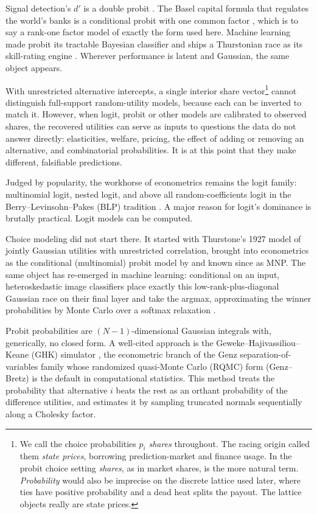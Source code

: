 \documentclass[12pt]{article}
\theoremstyle{remark}
\begin{document}
Signal detection's $d'$ is a
double probit \citep{green1966}. The Basel capital formula that
regulates the world's banks is a conditional probit with one common
factor \citep{vasicek2002,gordy2003}, which is to say a rank-one factor
model of exactly the form used here. Machine learning made probit its
tractable Bayesian classifier \citep{albertchib1993} and ships a
Thurstonian race as its skill-rating engine \citep{herbrich2006}.
Wherever performance is latent and Gaussian, the same object appears.

With unrestricted alternative intercepts, a single interior share
vector\footnote{We call the choice probabilities $p_i$ \emph{shares} throughout. The racing origin \citep{cotton2021} called them \emph{state prices}, borrowing prediction-market and finance usage. In the probit choice setting \emph{shares}, as in market shares, is the more natural term. \emph{Probability} would also be imprecise on the discrete lattice used later, where ties have positive probability and a dead heat splits the payout. The lattice objects really are state prices.} cannot distinguish full-support random-utility models, because
each can be inverted to match it. However, when logit, probit or other models  are calibrated to observed shares, the recovered utilities can serve as inputs to questions the data do not answer
directly: elasticities, welfare, pricing, the effect of adding or
removing an alternative, and combinatorial probabilities. It is at this point that they make different, falsifiable predictions. 

Judged by popularity, the workhorse of econometrics
remains the logit family: multinomial logit,
nested logit, and above all random-coefficients logit in the Berry--Levinsohn--Pakes (BLP) tradition
\citep{berry1995,train2009,conlon2020}. A major reason for logit's dominance is brutally practical. Logit
models can be computed.

Choice modeling did not start there. It started with Thurstone's 1927 model
\citep{thurstone1927} of jointly Gaussian utilities with unrestricted
correlation, brought into econometrics as the conditional (multinomial)
probit model by \citet{hausman1978} and known since as MNP. The same
object has re-emerged in machine learning: conditional on an input,
heteroskedastic image classifiers place exactly this
low-rank-plus-diagonal Gaussian race on their final layer and take the
argmax, approximating the winner probabilities by Monte Carlo over a
softmax relaxation \citep{collier2021}.

Probit probabilities are $(N-1)$-dimensional Gaussian integrals with,
generically, no closed form. A well-cited approach is the Geweke--Hajivassiliou--Keane
(GHK) simulator \citep{geweke1994,hajivassiliou1998,train2009}, the
econometric branch of the Genz separation-of-variables family
\citep{genz1992} whose randomized quasi-Monte Carlo (RQMC) form
(Genz--Bretz) is the default in
computational statistics.  This method treats
the probability that alternative $i$ beats the rest as an orthant
probability of the difference utilities, and estimates it by sampling
truncated normals sequentially along a Cholesky factor.
\end{document}
